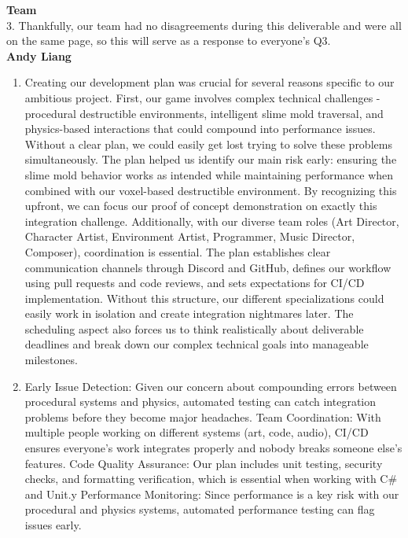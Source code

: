 \textbf{Team}\\
3. Thankfully, our team had no disagreements during this deliverable and were all on the same page, so this will serve as a response to everyone's Q3.\\


\textbf{Andy Liang}
\begin{enumerate}
\item{Creating our development plan was crucial for several reasons specific to our ambitious project. First, our game involves complex technical challenges - procedural destructible environments, intelligent slime mold traversal, and physics-based interactions that could compound into performance issues. Without a clear plan, we could easily get lost trying to solve these problems simultaneously. The plan helped us identify our main risk early: ensuring the slime mold behavior works as intended while maintaining performance when combined with our voxel-based destructible environment. By recognizing this upfront, we can focus our proof of concept demonstration on exactly this integration challenge. Additionally, with our diverse team roles (Art Director, Character Artist, Environment Artist, Programmer, Music Director, Composer), coordination is essential. The plan establishes clear communication channels through Discord and GitHub, defines our workflow using pull requests and code reviews, and sets expectations for CI/CD implementation. Without this structure, our different specializations could easily work in isolation and create integration nightmares later. The scheduling aspect also forces us to think realistically about deliverable deadlines and break down our complex technical goals into manageable milestones. }
\item{Early Issue Detection: Given our concern about compounding errors between procedural systems and physics, automated testing can catch integration problems before they become major headaches.
Team Coordination: With multiple people working on different systems (art, code, audio), CI/CD ensures everyone's work integrates properly and nobody breaks someone else's features.
Code Quality Assurance: Our plan includes unit testing, security checks, and formatting verification, which is essential when working with C\# and Unit.y
Performance Monitoring: Since performance is a key risk with our procedural and physics systems, automated performance testing can flag issues early.}
\end{enumerate}

